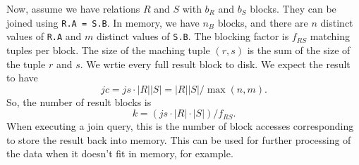 \documentclass[a4paper, openany]{memoir}
\theoremstyle{definition}
\theoremstyle{plain}
\begin{document}
Now, assume we have relations $R$ and $S$ with $b_R$ and $b_S$ blocks. They can be joined using \texttt{R.A = S.B}. In memory, we have $n_B$ blocks, and there are $n$ distinct values of \texttt{R.A} and $m$ distinct values of \texttt{S.B}. The blocking factor is $f_{RS}$ matching tuples per block. The size of the maching tuple $(r, s)$ is the sum of the size of the tuple $r$ and $s$. We wrtie every full result block to disk. We expect the result to have
\[\textit{jc} = \textit{js} \cdot  |R| |S| = |R| |S| /\max(n, m).\]
So, the number of result blocks is
\[k = (\textit{js} \cdot |R| \cdot |S|)/f_{RS}.\]
When executing a join query, this is the number of block accesses corresponding to store the result back into memory. This can be used for further processing of the data when it doesn't fit in memory, for example.  
\end{document}
